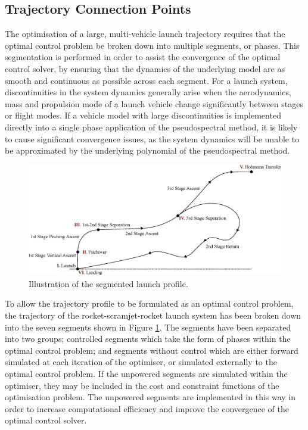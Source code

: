 \subsection{Trajectory Connection Points}
The optimisation of a large, multi-vehicle launch trajectory requires that the optimal control problem be broken down into multiple segments, or phases\cite{Patterson2015}. This segmentation is performed in order to assist the convergence of the optimal control solver, by ensuring that the dynamics of the underlying model are as smooth and continuous as possible across each segment. 
For a launch system, discontinuities in the system dynamics generally arise when the aerodynamics, mass and propulsion mode of a launch vehicle change significantly between stages or flight modes. 
If a vehicle model with large discontinuities is implemented directly into a single phase application of the pseudospectral method, it is likely to cause significant convergence issues, as the system dynamics will be unable to be approximated by the underlying polynomial of the pseudospectral method.
 \begin{figure}[ht]
 	\centering
 	\includegraphics[width=1.\linewidth]{figures/4_LODESTAR/Traj}
 	\caption{Illustration of the segmented launch profile.}
 	\label{fig:Traj}
 \end{figure}
 
 To allow the trajectory profile to be formulated as an optimal control problem, the trajectory of the rocket-scramjet-rocket launch system has been broken down into the seven segments shown in Figure \ref{fig:Traj}. 
  The segments have been separated into two groups; controlled segments which take the form of phases within the optimal control problem; and segments without control which are either forward simulated at each iteration of the optimiser, or simulated externally to the optimal control problem. If the unpowered segments are simulated within the optimiser, they may be included in the cost and constraint functions of the optimisation problem.
  The unpowered segments are implemented in this way in order to increase computational efficiency and improve the convergence of the optimal control solver. 
  
